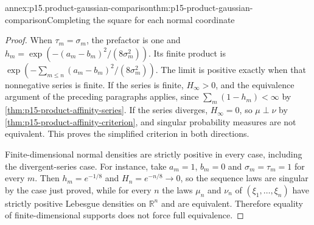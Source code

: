 \begin{annexitem}{annex:p15.product-gaussian-comparison}{thm:p15-product-gaussian-comparison}{Completing the square for each normal coordinate}
\begin{proof}
When \(\tau_m=\sigma_m\), the prefactor is one and
\(h_m=\exp(-(a_m-b_m)^2/(8\sigma_m^2))\).
Its finite product is
\(\exp(-\sum_{m\leq n}(a_m-b_m)^2/(8\sigma_m^2))\).
The limit is positive exactly when that nonnegative series is finite.
If the series is finite, \(H_\infty>0\), and the equivalence argument of
the preceding paragraphs applies, since \(\sum_m(1-h_m)<\infty\) by
\cref{thm:p15-product-affinity-series}. If the series diverges,
\(H_\infty=0\), so \(\mu\perp\nu\) by
\cref{thm:p15-product-affinity-criterion}, and singular probability
measures are not equivalent. This proves the simplified criterion in
both directions.

Finite-dimensional normal densities are strictly positive in every
case, including the divergent-series case. For instance, take
\(a_m=1\), \(b_m=0\) and \(\sigma_m=\tau_m=1\) for every \(m\). Then
\(h_m=e^{-1/8}\) and \(H_n=e^{-n/8}\to0\), so the sequence laws are
singular by the case just proved, while for every \(n\) the laws
\(\mu_n\) and \(\nu_n\) of \((\xi_1,\ldots,\xi_n)\) have strictly
positive Lebesgue densities on \(\mathbb R^n\) and are equivalent.
Therefore equality of finite-dimensional supports does not force full
equivalence.
\end{proof}
\end{annexitem}

